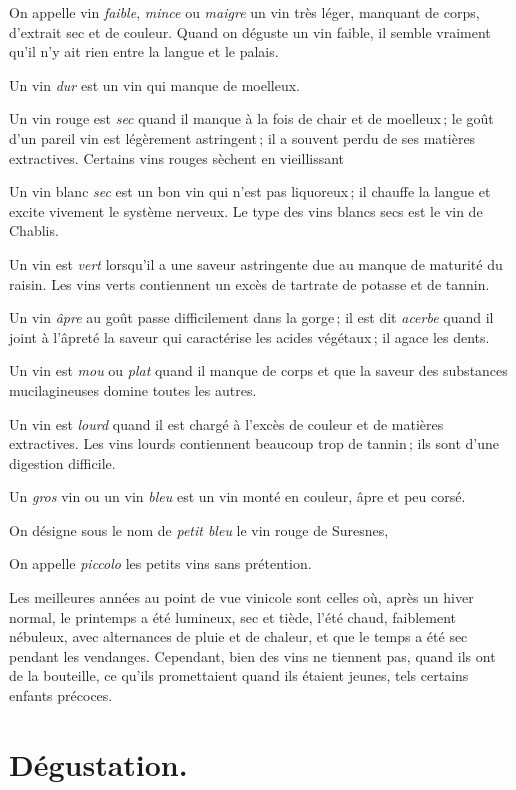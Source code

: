 On appelle vin \textit{faible}, \textit{mince} ou \textit{maigre} un vin très
léger, manquant de corps, d'extrait sec et de couleur. Quand on déguste un vin
faible, il semble vraiment qu'il n'y ait rien entre la langue et le palais.

Un vin \textit{dur} est un vin qui manque de moelleux.

Un vin rouge est \textit{sec} quand il manque à la fois de chair et de
moelleux ; le goût d'un pareil vin est légèrement astringent ; il a souvent
perdu de ses matières extractives. Certains vins rouges sèchent en vieillissant

Un vin blanc \textit{sec} est un bon vin qui n'est pas liquoreux ; il chauffe
la langue et excite vivement le système nerveux. Le type des vins blancs secs
est le vin de Chablis.

Un vin est \textit{vert} lorsqu'il a une saveur astringente due au manque de
maturité du raisin. Les vins verts contiennent un excès de tartrate de potasse
et de tannin.

Un vin \textit{âpre} au goût passe difficilement dans la gorge ; il est dit
\textit{acerbe} quand il joint à l'âpreté la saveur qui caractérise les acides
végétaux ; il agace les dents.

Un vin est \textit{mou} ou \textit{plat} quand il manque de corps et que la
saveur des substances mucilagineuses domine toutes les autres.

Un vin est \textit{lourd} quand il est chargé à l'excès de couleur et de
matières extractives. Les vins lourds contiennent beaucoup trop de tannin ; ils
sont d'une digestion difficile.

Un \textit{gros} vin ou un vin \textit{bleu} est un vin monté en couleur, âpre
et peu corsé.

On désigne sous le nom de \textit{petit bleu} le vin rouge de Suresnes,

On appelle \textit{piccolo} les petits vins sans prétention.

\medskip

Les meilleures années au point de vue vinicole sont celles où, après un hiver
normal, le printemps a été lumineux, sec et tiède, l'été chaud, faiblement
nébuleux, avec alternances de pluie et de chaleur, et que le temps a été sec
pendant les vendanges. Cependant, bien des vins ne tiennent pas, quand ils ont
de la bouteille, ce qu'ils promettaient quand ils étaient jeunes, tels certains
enfants précoces.

\section*{\centering Dégustation.}

